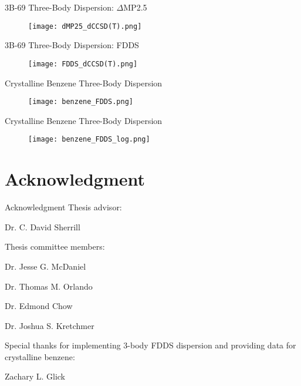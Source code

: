 \documentclass{beamer}
\begin{document}
        \begin{frame}{3B-69 Three-Body Dispersion: $\Delta$MP2.5}
            \begin{figure}
                \centering
                \texttt{[image: dMP25\_dCCSD(T).png]}
            \end{figure}
        \end{frame}

        \begin{frame}{3B-69 Three-Body Dispersion: FDDS}
            \begin{figure}
                \centering
                \texttt{[image: FDDS\_dCCSD(T).png]}
            \end{figure}
        \end{frame}

        \begin{frame}{Crystalline Benzene Three-Body Dispersion}
            \begin{figure}
                \centering
                \texttt{[image: benzene\_FDDS.png]}
            \end{figure}
        \end{frame}

        \begin{frame}{Crystalline Benzene Three-Body Dispersion}
            \begin{figure}
                \centering
                \texttt{[image: benzene\_FDDS\_log.png]}
            \end{figure}
        \end{frame}

\section{Acknowledgment}

        \begin{frame}{Acknowledgment}
            Thesis advisor:

            \hspace{36pt} Dr. C. David Sherrill

            Thesis committee members:

            \hspace{36pt} Dr. Jesse G. McDaniel

            \hspace{36pt} Dr. Thomas M. Orlando

            \hspace{36pt} Dr. Edmond Chow 

            \hspace{36pt} Dr. Joshua S. Kretchmer

            Special thanks for implementing 3-body FDDS dispersion and providing data for crystalline benzene:

            \hspace{36pt} Zachary L. Glick
        \end{frame}
\end{document}
